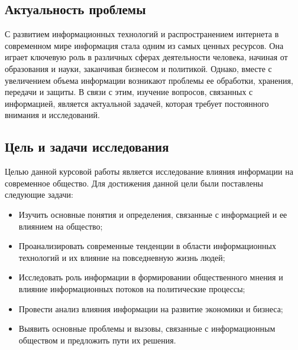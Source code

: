 \documentclass{article}
\begin{document}
\subsection{Актуальность проблемы}
С развитием информационных технологий и распространением интернета в современном мире информация стала одним из самых ценных ресурсов. Она играет ключевую роль в различных сферах деятельности человека, начиная от образования и науки, заканчивая бизнесом и политикой. Однако, вместе с увеличением объема информации возникают проблемы ее обработки, хранения, передачи и защиты. В связи с этим, изучение вопросов, связанных с информацией, является актуальной задачей, которая требует постоянного внимания и исследований.
\subsection{Цель и задачи исследования}
Целью данной курсовой работы является исследование влияния информации на современное общество. Для достижения данной цели были поставлены следующие задачи:
\begin{itemize}
\item Изучить основные понятия и определения, связанные с информацией и ее влиянием на общество;
\item Проанализировать современные тенденции в области информационных технологий и их влияние на повседневную жизнь людей;
\item Исследовать роль информации в формировании общественного мнения и влияние информационных потоков на политические процессы;
\item Провести анализ влияния информации на развитие экономики и бизнеса;
\item Выявить основные проблемы и вызовы, связанные с информационным обществом и предложить пути их решения.
\end{itemize}
\end{document}
